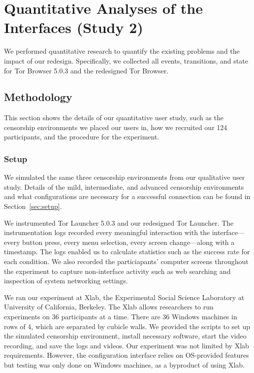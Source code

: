 \documentclass[USenglish,oneside,twocolumn]{article}
\begin{document}
\section{Quantitative Analyses of the Interfaces (Study 2)}
\label{sec:quantitative}
We performed quantitative research to quantify the existing problems
and the impact of our redesign. Specifically, we collected all events, transitions, 
and state for Tor Browser 5.0.3 and the redesigned Tor Browser.

\subsection{Methodology} 
This section shows the details of our quantitative user study, such as the censorship environments we placed our users in, how we recruited our 124 participants, and the procedure for the experiment. 

\subsubsection{Setup}
We simulated the same three censorship environments from 
our qualitative user study. Details of the mild, intermediate, and advanced 
censorship environments and what configurations are necessary for a 
successful connection can be found in Section~\ref{sec:setup}. 

We instrumented Tor Launcher 5.0.3 and our redesigned Tor Launcher.
The instrumentation logs recorded every meaningful interaction with the interface---every
button press, every menu selection, every screen change---along with a timestamp.
The logs enabled us to calculate statistics such as the success rate
for each condition. We also recorded the particiapants' computer screens 
throughout the experiment to capture non-interface activity such as 
web searching and inspection of system networking settings.

We ran our experiment at Xlab, the Experimental Social Science Laboratory at University of 
California, Berkeley. The Xlab allows researchers to run experiments on 36 participants at a time.
There are 36 Windows machines in rows of 4, which are separated by cubicle walls. 
We provided the scripts to set up the simulated censorship environment, install necessary software, 
start the video recording, and save the logs and videos. Our experiment was not limited by Xlab
requirements. However, the configuration interface relies on OS-provided features but testing 
was only done on Windows machines, as a byproduct of using Xlab. 
\end{document}
